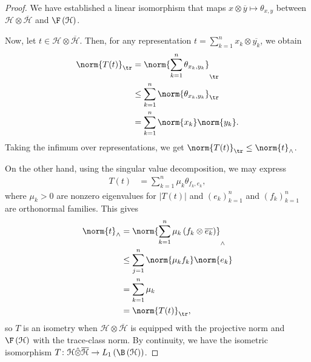 \documentclass[10pt]{mypackage}
\begin{document}
\begin{proof}
  We have established a linear isomorphism that maps $x\otimes \overline{y}\mapsto \theta_{x,y}$ between $\mathcal{H}\otimes \overline{\mathcal{H}}$ and $\F\left( \mathcal{H} \right)$.\newline

  Now, let $t\in \mathcal{H}\otimes \overline{\mathcal{H}}$. Then, for any representation $t = \sum_{k=1}^{n}x_k\otimes \overline{y_k}$, we obtain
  \begin{align*}
    \norm{T(t)}_{\tr} &= \norm{\sum_{k=1}^{n}\theta_{x_k,y_k}}_{\tr}\\
                      &\leq \sum_{k=1}^{n}\norm{\theta_{x_k,y_k}}_{\tr}\\
                      &= \sum_{k=1}^{n}\norm{x_k}\norm{y_k}.
  \end{align*}
  Taking the infimum over representations, we get $\norm{T(t)}_{\tr}\leq \norm{t}_{\wedge}$.\newline

  On the other hand, using the singular value decomposition, we may express
  \begin{align*}
    T(t) &= \sum_{k=1}^{n}\mu_k\theta_{f_k,e_k},
  \end{align*}
  where $\mu_k > 0$ are nonzero eigenvalues for $\left\vert T(t) \right\vert$ and $\left( e_k \right)_{k=1}^{n}$ and $\left( f_k \right)_{k=1}^{n}$ are orthonormal families. This gives
  \begin{align*}
    \norm{t}_{\wedge} &= \norm{\sum_{k=1}^{n}\mu_k\left( f_k\otimes \overline{e_k} \right)}_{\wedge}\\
                      &\leq \sum_{j=1}^{n}\norm{\mu_kf_k}\norm{e_k}\\
                      &= \sum_{k=1}^{n}\mu_k\\
                      &= \norm{T(t)}_{\tr},
  \end{align*}
  so $T$ is an isometry when $\mathcal{H}\otimes \overline{\mathcal{H}}$ is equipped with the projective norm and $\F\left( \mathcal{H} \right)$ with the trace-class norm. By continuity, we have the isometric isomorphism $T\colon \mathcal{H}\hat\otimes \overline{\mathcal{H}}\rightarrow L_1\left( \B\left( \mathcal{H} \right) \right)$.
\end{proof}
\end{document}
